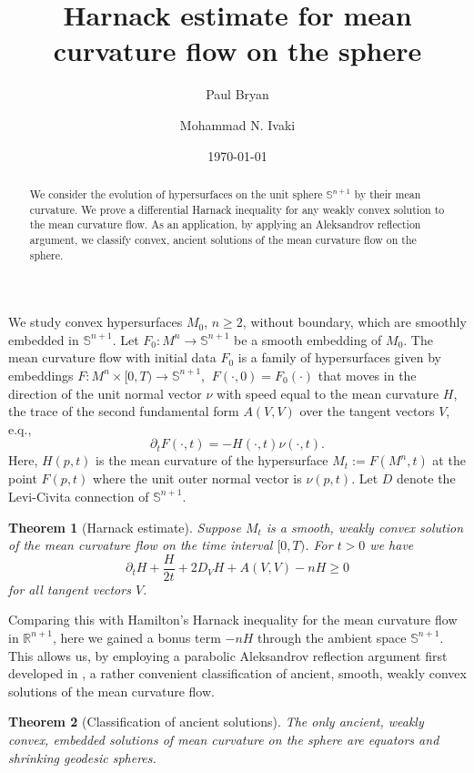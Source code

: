 \documentclass{amsart}
\newtheorem*{thmmain}{Theorem}
\theoremstyle{definition}
\theoremstyle{remark}
\numberwithin{equation}{section}
\begin{document}
\title[Harnack estimate for mean curvature flow on the sphere]
{Harnack estimate for mean curvature flow on the sphere}
\author[P. Bryan]{Paul Bryan}
\address{Department of Mathematics, University of California San Diego, La Jolla, USA}
\curraddr{}
\author[M.N. Ivaki]{Mohammad N. Ivaki}
\address{Institut f\"{u}r Diskrete Mathematik und Geometrie, Technische Universit\"{a}t Wien,
Wiedner Hauptstr. 8--10, 1040 Wien, Austria}
\curraddr{}
\date{\today}

\begin{abstract}
We consider the evolution of hypersurfaces on the unit sphere $\mathbb{S}^{n+1}$ by their mean curvature. We prove a differential Harnack inequality for any weakly convex solution to the mean curvature flow. As an application, by applying an Aleksandrov reflection argument, we classify convex, ancient solutions of the mean curvature flow on the sphere.
\end{abstract}
\maketitle
We study convex hypersurfaces $M_0$, $n\ge2$, without boundary, which are smoothly embedded in $\mathbb{S}^{n+1}.$ Let $F_0:M^n\to \mathbb{S}^{n+1}$ be a smooth embedding of $M_0$. The mean curvature flow with initial data $F_0$ is a family of hypersurfaces given by embeddings $F:M^n\times[0,T)\to \mathbb{S}^{n+1}$, $~ F(\cdot,0)=F_0(\cdot)$ that moves in the direction of the unit normal vector $\nu$ with speed equal to the mean curvature $H$, the trace of the second fundamental form $A(V,V)$ over the tangent vectors $V$, e.q.,
\[\partial_tF(\cdot,t)=-H(\cdot,t)\nu(\cdot,t).\]
Here, $H(p,t)$ is the mean curvature of the hypersurface $M_t:=F(M^n,t)$ at the point $F(p,t)$ where the unit outer normal vector is $\nu(p,t).$
Let $D$ denote the Levi-Civita connection of $\mathbb{S}^{n+1}.$
\begin{thmmain}[Harnack estimate]
Suppose $M_t$ is a smooth, weakly convex solution of the mean curvature flow on the time interval $[0,T)$. For $t>0$ we have
\[\partial_tH+\frac{H}{2t}+2D_VH+A(V,V)-nH\geq 0\]
for all tangent vectors $V$.
\end{thmmain}
Comparing this with Hamilton's Harnack inequality \cite{Hamilton 95} for the mean curvature flow in $\mathbb{R}^{n+1}$, here we gained a bonus term $-nH$ through the ambient space $\mathbb{S}^{n+1}.$ This allows us,
by employing a parabolic Aleksandrov reflection argument first developed in \cite{ Chow 97,Chow-Gul 01, Chow-Gul 96},  a rather convenient classification of ancient, smooth, weakly convex solutions of the mean curvature flow.
\begin{thmmain}[Classification of ancient solutions]
The only ancient, weakly convex, embedded solutions of mean curvature on the sphere are equators and shrinking geodesic spheres.
\end{thmmain}
\end{document}
